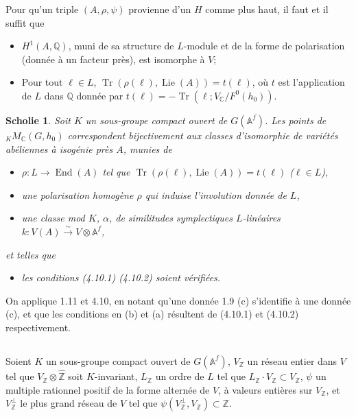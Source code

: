 \documentclass[11pt]{amsart}
\theoremstyle{plain}
\newtheorem{scholie}[theorem]{Scholie}
\theoremstyle{definition}
\DeclareMathOperator{\Lie}{Lie}
\DeclareMathOperator{\End}{End}
\DeclareMathOperator{\Tr}{Tr}
\newcommand{\ZZ}{\mathbb{Z}}
\newcommand{\QQ}{\mathbb{Q}}
\newcommand{\CC}{\mathbb{C}}
\newcommand{\AAf}{\mathbb{A}^f}
\newcommand{\MC}{M_{\mathbb{C}}}
\begin{document}
Pour qu'un triple $(A, \rho, \psi)$ provienne d'un $H$ comme plus haut, il faut et il suffit que
\begin{itemize}
\item[(4.10.1)] $H^1(A, \QQ)$, muni de sa structure de $L$-module et de la forme de polarisation (donn\'ee \`a un facteur pr\`es), est isomorphe \`a $V$;
\item[(4.10.2)] Pour tout $\ell \in L$, $\Tr(\rho(\ell), \Lie(A)) = t(\ell)$, o\`u $t$ est l'application de $L$ dans $\QQ$ donn\'ee par $t(\ell) = -\Tr(\ell ; V_{\CC}/F^0(h_0))$.
\end{itemize}

\begin{scholie}
Soit $K$ un sous-groupe compact ouvert de $G(\AAf)$. Les points de ${}_K \MC(G, h_0)$ correspondent bijectivement aux classes d'isomorphie de vari\'et\'es ab\'eliennes \`a isog\'enie pr\`es $A$, munies de
\begin{itemize}
\item[(a)] $\rho : L \to \End(A)$ tel que $\Tr(\rho(\ell), \Lie(A)) = t(\ell)$ ($\ell \in L$),
\item[(b)] une polarisation homog\`ene $\rho$ qui induise l'involution donn\'ee de $L$,
\item[(c)] une classe mod $K$, $\alpha$, de similitudes symplectiques $L$-lin\'eaires $k : V(A) \xrightarrow{\sim} V \otimes \AAf$,
\end{itemize}
et telles que
\begin{itemize}
\item[(e)] les conditions (4.10.1) (4.10.2) soient v\'erifi\'ees.
\end{itemize}
\end{scholie}

On applique 1.11 et 4.10, en notant qu'une donn\'ee 1.9 (c) s'identifie \`a une donn\'ee (c), et que les conditions en (b) et (a) r\'esultent de (4.10.1) et (4.10.2) respectivement.

\subsection{}

Soient $K$ un sous-groupe compact ouvert de $G(\AAf)$, $V_{\ZZ}$ un r\'eseau entier dans $V$ tel que $V_{\ZZ} \otimes \hat{\ZZ}$ soit $K$-invariant, $L_{\ZZ}$ un ordre de $L$ tel que $L_{\ZZ} \cdot V_{\ZZ} \subset V_{\ZZ}$, $\psi$ un multiple rationnel positif de la forme altern\'ee de $V$, \`a valeurs enti\`eres sur $V_{\ZZ}$, et $V_{\ZZ}^\perp$ le plus grand r\'eseau de $V$ tel que $\psi(V_{\ZZ}^\perp, V_{\ZZ}) \subset \ZZ$.
\end{document}

